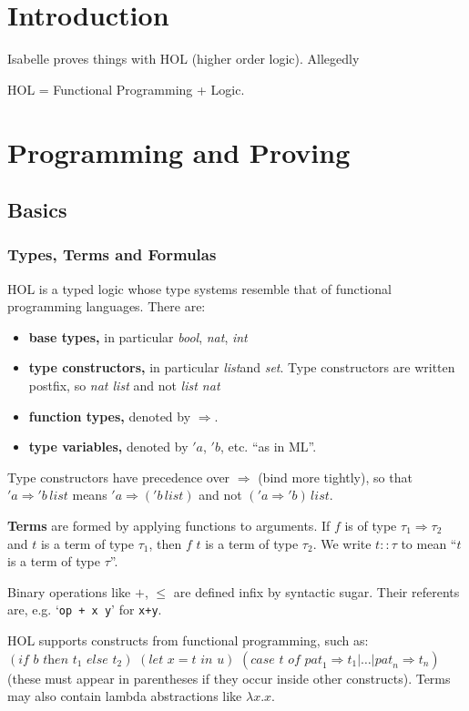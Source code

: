 \documentclass{article}
\newcommand{\bool}{\textit{bool}}
\newcommand{\nat}{\textit{nat}}
\newcommand{\listt}{\textit{list}}
\begin{document}
\section{Introduction}
Isabelle proves things with HOL (higher order logic). Allegedly
\begin{center}
HOL = Functional Programming + Logic.
\end{center}

\section{Programming and Proving}
\subsection{Basics}
\subsubsection{Types, Terms and Formulas}
HOL is a typed logic whose type systems resemble that of functional 
programming languages. There are:

\begin{itemize}
\item \textbf{base types,} in particular \bool, \nat, 
  \textit{int}
\item \textbf{type constructors,} in particular \listt and 
  \textit{set}. Type constructors are written postfix, so \textit{nat 
    list} and not \textit{list nat}
\item \textbf{function types,} denoted by $\Rightarrow$.
\item \textbf{type variables,} denoted by $'a$, $'b$, etc. ``as in ML''.
\end{itemize}
Type constructors have precedence over $\Rightarrow$ (bind more 
tightly), so that $'a \Rightarrow 'b\,\listt$ means 
$'a \Rightarrow ('b \,\listt)$ and not $('a \Rightarrow 'b)\,list$.

\textbf{Terms} are formed by applying functions to arguments. If $f$ 
is of type $\tau_{1} \Rightarrow \tau_{2}$ and $t$ is a term of type 
$\tau_{1}$, then $f\,\,t$ is a term of type $\tau_{2}$. We write 
$t::\tau$ to mean ``$t$ is a term of type $\tau$''. 

Binary operations like $+$, $\le$ are defined infix by syntactic 
sugar. Their referents are, e.g. `\verb|op + x y|' for \verb|x+y|. 

HOL supports constructs from functional programming, such as: 
$(\textit{if }b\textit{ then }t_{1}\textit{ else }t_{2})$
$(\textit{let }x=t\textit{ in }u)$
$(\textit{case } t \textit{ of } \textit{pat}_{1} \Rightarrow t_{1} | \ldots | \textit{pat}_{n} \Rightarrow t_{n})$
(these must appear in parentheses if they occur inside other constructs).
Terms may also contain lambda abstractions like $\lambda x.x$.
\end{document}
